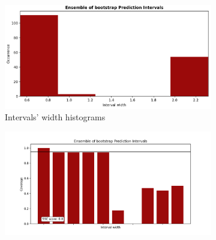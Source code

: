 \begin{figure}[ht]
    \centering
    \begin{subfigure}[b]{0.32\textwidth}
        \centering
        \includegraphics[width=1.05\textwidth, height=0.85\textwidth]{Figures/timeseries/with-change-point/width-occurrence-timeseries-problem-with-change-point.png}
        \caption{Intervals' width histograms}
        \label{subfig:timeseries-width-histograms-cpoint}
    \end{subfigure}
    \hfill
    \begin{subfigure}[b]{0.32\textwidth}
        \centering
        \includegraphics[width=1.15\textwidth, height=0.85\textwidth]{Figures/timeseries/with-change-point/coverage-vs-width-timeseries-problem-with-change-point.png}

\end{subfigure}
\end{figure}
